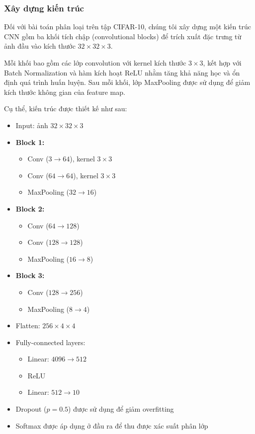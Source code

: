 \subsubsection{Xây dựng kiến trúc}

Đối với bài toán phân loại trên tập CIFAR-10, chúng tôi xây dựng một kiến trúc CNN gồm ba khối tích chập (convolutional blocks) để trích xuất đặc trưng từ ảnh đầu vào kích thước $32 \times 32 \times 3$.

Mỗi khối bao gồm các lớp convolution với kernel kích thước $3 \times 3$, kết hợp với Batch Normalization và hàm kích hoạt ReLU nhằm tăng khả năng học và ổn định quá trình huấn luyện. Sau mỗi khối, lớp MaxPooling được sử dụng để giảm kích thước không gian của feature map.

Cụ thể, kiến trúc được thiết kế như sau:

\begin{itemize}
\item Input: ảnh $32 \times 32 \times 3$

\item \textbf{Block 1:}
\begin{itemize}
\item Conv ($3 \rightarrow 64$), kernel $3 \times 3$
\item Conv ($64 \rightarrow 64$), kernel $3 \times 3$
\item MaxPooling ($32 \rightarrow 16$)
\end{itemize}

\item \textbf{Block 2:}
\begin{itemize}
\item Conv ($64 \rightarrow 128$)
\item Conv ($128 \rightarrow 128$)
\item MaxPooling ($16 \rightarrow 8$)
\end{itemize}

\item \textbf{Block 3:}
\begin{itemize}
\item Conv ($128 \rightarrow 256$)
\item MaxPooling ($8 \rightarrow 4$)
\end{itemize}

\item Flatten: $256 \times 4 \times 4$

\item Fully-connected layers:
\begin{itemize}
\item Linear: $4096 \rightarrow 512$
\item ReLU
\item Linear: $512 \rightarrow 10$
\end{itemize}

\item Dropout ($p = 0.5$) được sử dụng để giảm overfitting
\item Softmax được áp dụng ở đầu ra để thu được xác suất phân lớp
\end{itemize}

